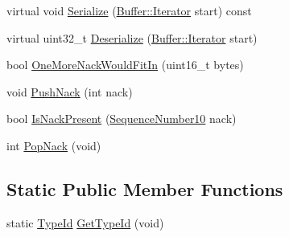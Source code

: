 \begin{DoxyCompactItemize}
\item 
virtual void \hyperlink{classns3_1_1LteRlcAmHeader_a13e1d8871b0ea12ff02bf6b7c36f7266}{Serialize} (\hyperlink{classns3_1_1Buffer_1_1Iterator}{Buffer\+::\+Iterator} start) const 
\item 
virtual uint32\+\_\+t \hyperlink{classns3_1_1LteRlcAmHeader_abc3714ee128319f59a491a97622c2690}{Deserialize} (\hyperlink{classns3_1_1Buffer_1_1Iterator}{Buffer\+::\+Iterator} start)
\item 
bool \hyperlink{classns3_1_1LteRlcAmHeader_a32437e4b5c7ec5970ba98368a6de8a9b}{One\+More\+Nack\+Would\+Fit\+In} (uint16\+\_\+t bytes)
\item 
void \hyperlink{classns3_1_1LteRlcAmHeader_a5dce7a943caefe28dfe7ec2f19f01457}{Push\+Nack} (int nack)
\item 
bool \hyperlink{classns3_1_1LteRlcAmHeader_ae8b9985c80d212195999decc005244c1}{Is\+Nack\+Present} (\hyperlink{classns3_1_1SequenceNumber10}{Sequence\+Number10} nack)
\item 
int \hyperlink{classns3_1_1LteRlcAmHeader_a792ffb52395291e4787a978e5b0e1eef}{Pop\+Nack} (void)
\end{DoxyCompactItemize}
\subsection*{Static Public Member Functions}
\begin{DoxyCompactItemize}
\item 
static \hyperlink{classns3_1_1TypeId}{Type\+Id} \hyperlink{classns3_1_1LteRlcAmHeader_a5e38efd3458db0da054e8ba4d809f63b}{Get\+Type\+Id} (void)
\end{DoxyCompactItemize}
